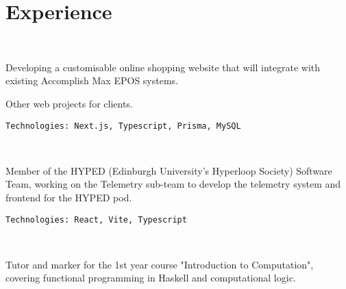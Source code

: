 \documentclass[]{hieudo-build}
\begin{document}
\begin{minipage}[t]{0.62\textwidth}

	\section{Experience}

	\\
	\vspace{0.9em} %
	\begin{tightemize}
		\item Developing a customisable online shopping website that will integrate with existing Accomplish Max EPOS systems.
		\item Other web projects for clients.
	\end{tightemize}
	\verb|Technologies: Next.js, Typescript, Prisma, MySQL|
	\sectionsep

	\\
	\begin{tightemize}
		\item Member of the HYPED (Edinburgh University's Hyperloop Society) Software Team, working on the Telemetry sub-team to develop the telemetry system and frontend for the HYPED pod.
	\end{tightemize}
	\verb|Technologies: React, Vite, Typescript|
	\sectionsep

	\\
	\begin{tightemize}
		\item Tutor and marker for the 1st year course "Introduction to Computation", covering functional programming in Haskell and computational logic.
	\end{tightemize}
	\sectionsep



\end{minipage}
\end{document}
